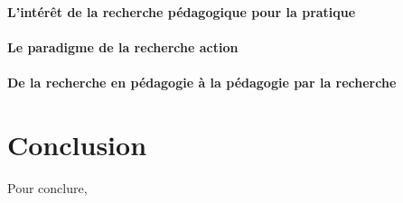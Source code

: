 \documentclass[a4paper,11pt]{article}
\begin{document}
			\subsection{L'intérêt de la recherche pédagogique pour la pratique}
			\subsection{Le paradigme de la recherche action}
			\subsection{De la recherche en pédagogie à la pédagogie par la recherche}



\part*{Conclusion}
Pour conclure,

\nocite{*}


\end{document}
